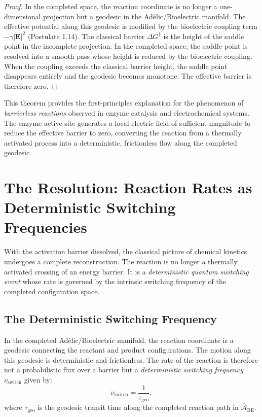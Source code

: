 \documentclass[11pt,openany]{extbook}
\theoremstyle{plain}
\theoremstyle{definition}
\begin{document}
\begin{proof}
In the completed space, the reaction coordinate is no longer a one-dimensional projection but a geodesic in the Adèlic/Bioelectric manifold. The effective potential along this geodesic is modified by the bioelectric coupling term $-\gamma|\mathbf{E}|^2$ (Postulate 1.14). The classical barrier $\Delta G^{\ddagger}$ is the height of the saddle point in the incomplete projection. In the completed space, the saddle point is resolved into a smooth pass whose height is reduced by the bioelectric coupling. When the coupling exceeds the classical barrier height, the saddle point disappears entirely and the geodesic becomes monotone. The effective barrier is therefore zero.
\end{proof}

\noindent This theorem provides the first-principles explanation for the phenomenon of \emph{barrierless reactions} observed in enzyme catalysis and electrochemical systems. The enzyme active site generates a local electric field of sufficient magnitude to reduce the effective barrier to zero, converting the reaction from a thermally activated process into a deterministic, frictionless flow along the completed geodesic.

\section{The Resolution: Reaction Rates as Deterministic Switching Frequencies}

\noindent With the activation barrier dissolved, the classical picture of chemical kinetics undergoes a complete reconstruction. The reaction is no longer a thermally activated crossing of an energy barrier. It is a \emph{deterministic quantum switching event} whose rate is governed by the intrinsic switching frequency of the completed configuration space.

\subsection{The Deterministic Switching Frequency}

\noindent In the completed Adèlic/Bioelectric manifold, the reaction coordinate is a geodesic connecting the reactant and product configurations. The motion along this geodesic is deterministic and frictionless. The rate of the reaction is therefore not a probabilistic flux over a barrier but a \emph{deterministic switching frequency} $\nu_{\mathrm{switch}}$ given by:
\[
\nu_{\mathrm{switch}} = \frac{1}{\tau_{\mathrm{geo}}},
\]
where $\tau_{\mathrm{geo}}$ is the geodesic transit time along the completed reaction path in $\overline{\mathcal{A}}_{\mathrm{BE}}$.
\end{document}
